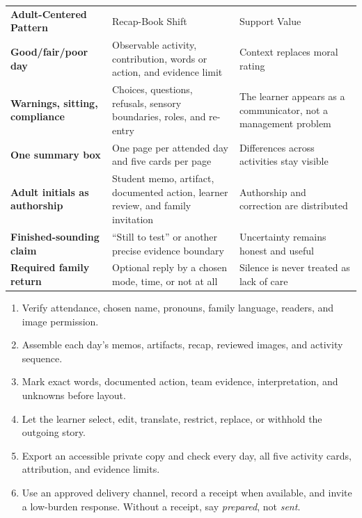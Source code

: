 \renewcommand{\arraystretch}{1.08}
\setlength{\tabcolsep}{4pt}
\begin{tabularx}{\textwidth}{>{\bfseries\RaggedRight\arraybackslash}p{1.35in} >{\RaggedRight\arraybackslash}p{2.54in} >{\RaggedRight\arraybackslash}X}
\rowcolor{MidTeal}
\color{white}Adult-Centered Pattern & \color{white}Recap-Book Shift & \color{white}Support Value \\
Good/fair/poor day & Observable activity, contribution, words or action, and evidence limit & Context replaces moral rating \\
\rowcolor{SoftGray}
Warnings, sitting, compliance & Choices, questions, refusals, sensory boundaries, roles, and re-entry & The learner appears as a communicator, not a management problem \\
One summary box & One page per attended day and five cards per page & Differences across activities stay visible \\
\rowcolor{SoftGray}
Adult initials as authorship & Student memo, artifact, documented action, learner review, and family invitation & Authorship and correction are distributed \\
Finished-sounding claim & ``Still to test'' or another precise evidence boundary & Uncertainty remains honest and useful \\
\rowcolor{SoftGray}
Required family return & Optional reply by a chosen mode, time, or not at all & Silence is never treated as lack of care \\
\end{tabularx}


\begin{enumerate}
	\item Verify attendance, chosen name, pronouns, family language, readers, and image permission.
	\item Assemble each day's memos, artifacts, recap, reviewed images, and activity sequence.
	\item Mark exact words, documented action, team evidence, interpretation, and unknowns before layout.
	\item Let the learner select, edit, translate, restrict, replace, or withhold the outgoing story.
	\item Export an accessible private copy and check every day, all five activity cards, attribution, and evidence limits.
	\item Use an approved delivery channel, record a receipt when available, and invite a low-burden response. Without a receipt, say \textit{prepared}, not \textit{sent}.
\end{enumerate}

